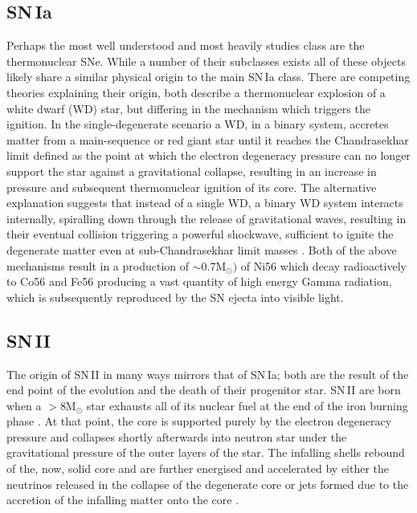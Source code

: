 \subsection{SN\,Ia}
Perhaps the most well understood and most heavily studies class are the thermonuclear SNe. While a number of their subclasses exists \citep[amongst others: SN\,.Ia, SN\'Iax, SN\,Ia-91T, SN\,Ia-91bg][]{Alsabti2017} all of these objects likely share a similar physical origin to the main SN\,Ia class. There are competing theories explaining their origin, both describe a thermonuclear explosion of a white dwarf (WD) star, but differing in the mechanism which triggers the ignition. In the single-degenerate scenario \citep{Whelan1973} a WD, in a binary system, accretes matter from a main-sequence or red giant star until it reaches the Chandrasekhar limit defined as the point at which the electron degeneracy pressure can no longer support the star against a gravitational collapse, resulting in an increase in pressure and subsequent thermonuclear ignition of its core. The alternative explanation suggests that instead of a single WD, a binary WD system interacts internally, spiralling down through the release of gravitational waves, resulting in their eventual collision triggering a powerful shockwave, sufficient to ignite the degenerate matter even at sub-Chandrasekhar limit masses \citep{Iben1984}. Both of the above mechanisms result in a production of $\sim$0.7M$_\odot)$ of Ni56 \citep{Scalzo2014} which decay radioactively to Co56 and Fe56 producing a vast quantity of high energy Gamma radiation, which is subsequently reproduced by the SN ejecta into visible light.

\subsection{SN\,II}
The origin of SN\,II in many ways mirrors that of SN\,Ia; both are the result of the end point of the evolution and the death of their progenitor star. SN\,II are born when a $>$8M$_\odot$ star exhausts all of its nuclear fuel at the end of the iron burning phase \citep{Clayton1983}. At that point, the core is supported purely by the electron degeneracy pressure and collapses shortly afterwards into neutron star under the gravitational pressure of the outer layers of the star. The infalling shells rebound of the, now, solid core and are further energised and accelerated by either the neutrinos released in the collapse of the degenerate core \citep{Burrows1987} or jets formed due to the accretion of the infalling matter onto the core \citep{Khokhlov1999,Burrows2007}.

